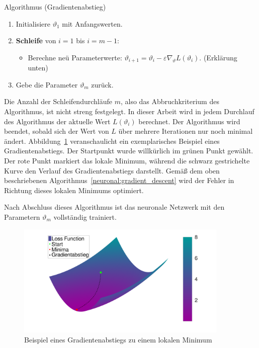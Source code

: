 \begin{aufgabe}
    Algorithmus (Gradientenabstieg)
    \begin{enumerate}
        \item Initialisiere \( \vartheta_1 \) mit Anfangswerten.
        \item \textbf{Schleife} von \( i = 1 \) bis \( i = m - 1 \):
        \begin{itemize}
            \item Berechne neü Parameterwerte: \( \vartheta_{i+1} = \vartheta_i - \varepsilon \nabla_\vartheta L\left(\vartheta_i\right) \). (Erklärung unten)
        \end{itemize}
        \item Gebe die Parameter \( \vartheta_m \) zurück.
    \end{enumerate}
    \label{neuronal:gradient_descent}
\end{aufgabe}

Die Anzahl der Schleifendurchläufe \( m \), also das Abbruchkriterium des Algorithmus, ist nicht streng festgelegt.
In dieser Arbeit wird in jedem Durchlauf des Algorithmus der aktuelle Wert \( L(\vartheta_i) \) berechnet.
Der Algorithmus wird beendet, sobald sich der Wert von \( L \) über mehrere Iterationen nur noch minimal ändert.
Abbildung~\ref{fig:gradientenabstieg_beispiel} veranschaulicht ein exemplarisches Beispiel eines Gradientenabstiegs.
Der Startpunkt wurde willkürlich im grünen Punkt gewählt.
Der rote Punkt markiert das lokale Minimum, während die schwarz gestrichelte Kurve den Verlauf des Gradientenabstiegs darstellt.
Gemäß dem oben beschriebenen Algorithmus~\ref{neuronal:gradient_descent} wird der Fehler in Richtung dieses lokalen Minimums optimiert.

Nach Abschluss dieses Algorithmus ist das neuronale Netzwerk mit den Parametern \( \vartheta_m \) vollständig trainiert.

\begin{figure}[H]
    \centering
    \hspace*{-0.1\textwidth}
    \includegraphics[width=0.9\textwidth]{papers/neuronal/images/gd_close_to_minima_long_distances_with_line.png}
    \caption{Beispiel eines Gradientenabstiegs zu einem lokalen Minimum}
    \label{fig:gradientenabstieg_beispiel}
\end{figure}



